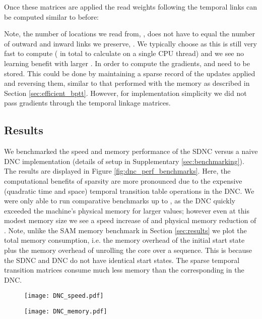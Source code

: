 \documentclass{article}
\begin{document}
Once these matrices are applied the read weights following the temporal links can be computed similar to before:


Note, the number of locations we read from, , does not have to equal the number of outward and inward links we preserve, . We typically choose  as this is still very fast to compute ( in total to calculate  on a single CPU thread) and we see no learning benefit with larger . In order to compute the gradients,  and  need to be stored. This could be done by maintaining a sparse record of the updates applied and reversing them, similar to that performed with the memory as described in Section \ref{sec:efficient_bptt}. However, for implementation simplicity we did not pass gradients through the temporal linkage matrices.

\subsection{Results}
We benchmarked the speed and memory performance of the SDNC versus a naive DNC implementation (details of setup in Supplementary \ref{sec:benchmarking}). The results are displayed in Figure \ref{fig:dnc_perf_benchmarks}. Here, the computational benefits of sparsity are more pronounced due to the expensive (quadratic time and space) temporal transition table operations in the DNC. We were only able to run comparative benchmarks up to , as the DNC quickly exceeded the machine's physical memory for larger values; however even at this modest memory size we see a speed increase of  and physical memory reduction of . Note, unlike the SAM memory benchmark in Section \ref{sec:results} we plot the total memory consumption, i.e. the memory overhead of the initial start state plus the memory overhead of unrolling the core over a sequence. This is because the SDNC and DNC do not have identical start states. The sparse temporal transition matrices  consume much less memory than the corresponding  in the DNC.

\begin{figure*}[h]
    \centering
\begin{subfigure}{0.47\textwidth}
    \texttt{[image: DNC\_speed.pdf]}
    \caption{ \label{sf:dnc_speed}}
    \end{subfigure}
\begin{subfigure}{0.47\textwidth}
    \texttt{[image: DNC\_memory.pdf]}
    \caption{ \label{sf:dnc_memory}}
    \end{subfigure}
\caption{Performance benchmarks between the DNC and SDNC for small to medium memory sizes. Here the SDNC uses a linear KNN. \textbf{()} Wall-clock time of a single forward and backward pass.
    \textbf{()} Total memory usage (including initialization) when trained over sequence of  time steps.
}
    \label{fig:dnc_perf_benchmarks}
\end{figure*}
\end{document}
